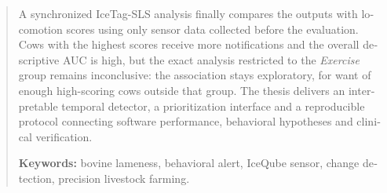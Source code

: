 \begin{otherlanguage}{english}
\begin{abstract}
A synchronized IceTag-SLS analysis finally compares the outputs with locomotion scores using
only sensor data collected before the evaluation. Cows with the highest scores receive more
notifications and the overall descriptive AUC is high, but the exact analysis restricted to the
\textit{Exercise} group remains inconclusive: the association stays exploratory, for want of
enough high-scoring cows outside that group. The thesis delivers an interpretable temporal
detector, a prioritization interface and a reproducible protocol connecting software performance,
behavioral hypotheses and clinical verification.

\vspace{1em}
\textbf{Keywords:} bovine lameness, behavioral alert, IceQube sensor, change detection,
precision livestock farming.
\end{abstract}
\end{otherlanguage}
